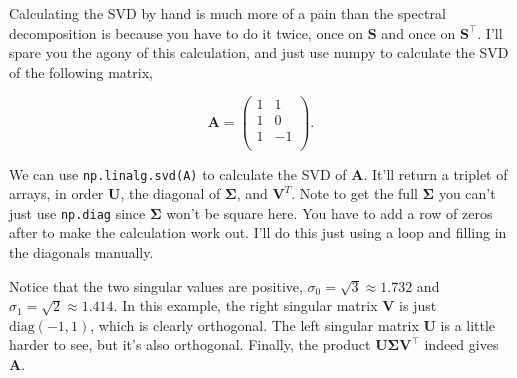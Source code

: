 \documentclass[
  letterpaper,
  DIV=11,
  numbers=noendperiod]{scrreprt}
\begin{document}
Calculating the SVD by hand is much more of a pain than the spectral
decomposition is because you have to do it twice, once on \(\mathbf{S}\)
and once on \(\mathbf{S}^\top\). I'll spare you the agony of this
calculation, and just use numpy to calculate the SVD of the following
matrix,

\[
\mathbf{A} = 
\begin{pmatrix}
1 & 1 \\
1 & 0 \\
1 & -1 \\
\end{pmatrix}.
\]

We can use \texttt{np.linalg.svd(A)} to calculate the SVD of
\(\mathbf{A}\). It'll return a triplet of arrays, in order
\(\mathbf{U}\), the diagonal of \(\mathbf{\Sigma}\), and
\(\mathbf{V}^T\). Note to get the full \(\mathbf{\Sigma}\) you can't
just use \texttt{np.diag} since \(\mathbf{\Sigma}\) won't be square
here. You have to add a row of zeros after to make the calculation work
out. I'll do this just using a loop and filling in the diagonals
manually.

Notice that the two singular values are positive,
\(\sigma_0 = \sqrt{3} \approx 1.732\) and
\(\sigma_1 = \sqrt{2} \approx 1.414\). In this example, the right
singular matrix \(\mathbf{V}\) is just \(\text{diag}(-1, 1)\), which is
clearly orthogonal. The left singular matrix \(\mathbf{U}\) is a little
harder to see, but it's also orthogonal. Finally, the product
\(\mathbf{U}\mathbf{\Sigma}\mathbf{V}^\top\) indeed gives
\(\mathbf{A}\).
\end{document}
